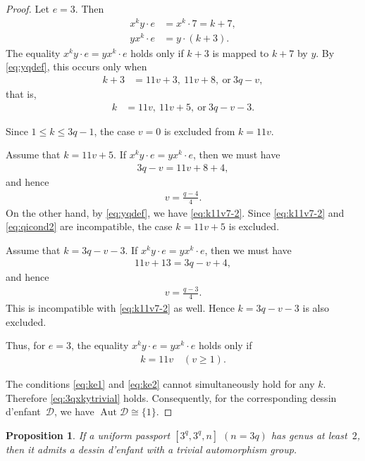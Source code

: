 \documentclass[12pt,reqno]{amsart}
\newcommand{\msD}{\mathscr{D}}
\newcommand{\q}{\quad}									%
\newcommand{\f}[2]{\frac{#1}{#2}}							%
\DeclareMathOperator{\Aut}{Aut}							%
\theoremstyle{mythmstyle}
\newtheorem{prop}[lemma]{Proposition}
\theoremstyle{mydefstyle}
\newcommand{\dde}{dessin d'enfant\xspace}
\newcommand{\AD}{\Aut{\msD}}
\numberwithin{equation}{section}
\begin{document}
\begin{proof}
\item[(ii)] Let $e = 3$. Then
\begin{align}
x^{k}y\cdot e &= x^{k} \cdot 7 = k+7, \\
yx^{k}\cdot e &= y\cdot(k+3).
\end{align}
The equality $x^{k}y\cdot e = yx^{k}\cdot e$ holds only if
$k+3$ is mapped to $k+7$ by $y$. By \eqref{eq:yqdef}, this occurs only when
\begin{align}
k + 3 &= 11v+3,\ 11v+8,\ \text{or}\ 3q-v,
\end{align}
that is,
\begin{align}
k &= 11v,\ 11v+5,\ \text{or}\ 3q-v-3.
\end{align}

Since $1 \le k \le 3q-1$, the case $v = 0$ is excluded from $k = 11v$. 

Assume that $k = 11v+5$. If $x^{k}y\cdot e = yx^{k}\cdot e$,
then we must have
\begin{align}
3q - v = 11v+8+4,
\end{align}
and hence
\begin{align}
\label{eq:qicond2}
v = \f{q-4}{4}.
\end{align}
On the other hand, by \eqref{eq:yqdef}, we have \eqref{eq:k11v7-2}.
Since \eqref{eq:k11v7-2} and \eqref{eq:qicond2} are incompatible, the case
$k = 11v+5$ is excluded.

Assume that $k = 3q-v-3$. If $x^{k}y\cdot e = yx^{k}\cdot e$,
then we must have
\begin{align}
11v+13 = 3q-v+4,
\end{align}
and hence
\begin{align}
v = \f{q-3}{4}.
\end{align}
This is incompatible with \eqref{eq:k11v7-2} as well. Hence $k = 3q-v-3$ is also excluded.

Thus, for $e = 3$, the equality $x^{k}y\cdot e = yx^{k}\cdot e$ holds only if
\begin{align}
\label{eq:ke2}
k = 11v\q (v \ge 1).
\end{align}

The conditions \eqref{eq:ke1} and \eqref{eq:ke2} cannot simultaneously hold for any $k$. Therefore
\eqref{eq:3qxkytrivial} holds.
Consequently, for the corresponding \dde\ $\msD$, we have
$\AD \cong \{ 1 \}$.
\end{proof}

\begin{prop}
\label{prop:class3beq3}
If a uniform passport $[3^{q}, 3^{q}, n]$ $(n = 3q)$ has genus at least~$2$, then it admits a \dde with a trivial automorphism group.
\end{prop}
\end{document}
